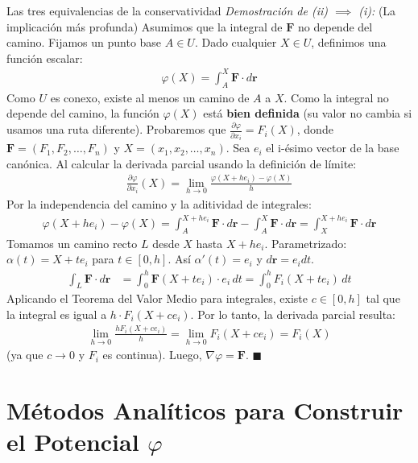 \documentclass[11pt,a4paper]{article}
\begin{document}
\begin{teoremabox}{Las tres equivalencias de la conservatividad}
\textit{Demostración de (ii) $\implies$ (i):} (La implicación más profunda)
Asumimos que la integral de $\mathbf{F}$ no depende del camino. Fijamos un punto base $A \in U$. Dado cualquier $X \in U$, definimos una función escalar:
\begin{align*}
\varphi(X) = \int_{A}^{X} \mathbf{F} \cdot d\mathbf{r}
\end{align*}
Como $U$ es conexo, existe al menos un camino de $A$ a $X$. Como la integral no depende del camino, la función $\varphi(X)$ está \textbf{bien definida} (su valor no cambia si usamos una ruta diferente).
Probaremos que $\frac{\partial \varphi}{\partial x_i} = F_i(X)$, donde $\mathbf{F} = (F_1, F_2, \dots, F_n)$ y $X = (x_1, x_2, \dots, x_n)$.
Sea $e_i$ el i-ésimo vector de la base canónica. Al calcular la derivada parcial usando la definición de límite:
\begin{align*}
\frac{\partial \varphi}{\partial x_i}(X) = \lim_{h \to 0} \frac{\varphi(X + h e_i) - \varphi(X)}{h}
\end{align*}
Por la independencia del camino y la aditividad de integrales:
\begin{align*}
\varphi(X + h e_i) - \varphi(X) = \int_{A}^{X + h e_i} \mathbf{F} \cdot d\mathbf{r} - \int_{A}^{X} \mathbf{F} \cdot d\mathbf{r} = \int_{X}^{X + h e_i} \mathbf{F} \cdot d\mathbf{r}
\end{align*}
Tomamos un camino recto $L$ desde $X$ hasta $X + h e_i$. Parametrizado: $\alpha(t) = X + t e_i$ para $t \in [0,h]$. Así $\alpha'(t) = e_i$ y $d\mathbf{r} = e_i dt$.
\begin{align*}
\int_{L} \mathbf{F} \cdot d\mathbf{r} &= \int_0^h \mathbf{F}(X + t e_i) \cdot e_i \, dt = \int_0^h F_i(X + t e_i) \, dt
\end{align*}
Aplicando el Teorema del Valor Medio para integrales, existe $c \in [0, h]$ tal que la integral es igual a $h \cdot F_i(X + c e_i)$.
Por lo tanto, la derivada parcial resulta:
\begin{align*}
\lim_{h \to 0} \frac{h F_i(X + c e_i)}{h} = \lim_{h \to 0} F_i(X + c e_i) = F_i(X)
\end{align*}
(ya que $c \to 0$ y $F_i$ es continua). Luego, $\nabla \varphi = \mathbf{F}$. $\blacksquare$
\end{teoremabox}

\section{Métodos Analíticos para Construir el Potencial $\varphi$}
\end{document}
